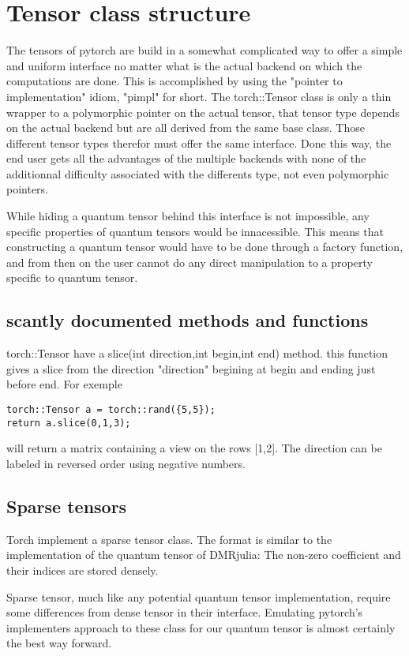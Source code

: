 \documentclass[15pt]{report}
\begin{document}
\section{Tensor class structure}

The tensors of pytorch are build in a somewhat complicated way to offer a simple and uniform interface no matter what is the actual backend on which the computations are done.
This is accomplished by using the "pointer to implementation" idiom, "pimpl" for short. The torch::Tensor class is only a thin wrapper to a polymorphic pointer on the actual tensor, that tensor type depends on the actual backend but are all derived from the same base class. Those different tensor types therefor must offer the same interface.
Done this way, the end user gets all the advantages of the multiple backends with none of the additionnal difficulty associated with the differents type, not even polymorphic pointers.

While hiding a quantum tensor behind this interface is not impossible, any specific properties of quantum tensors would be innacessible. This means that constructing a quantum tensor would have to be done through a factory function, and from then on the user cannot do any direct manipulation to a property specific to quantum tensor.

\subsection{scantly documented methods and functions}
torch::Tensor have a slice(int direction,int begin,int end) method. this function gives a slice from the direction "direction" begining at begin and ending just before end.
For exemple
\begin{verbatim}
torch::Tensor a = torch::rand({5,5});
return a.slice(0,1,3); 
\end{verbatim}
will return a matrix containing a view on the rows [1,2].
The direction can be labeled in reversed order using negative numbers.


\subsection{Sparse tensors}
Torch implement a sparse tensor class. The format is similar to the implementation of the quantum tensor of DMRjulia: The non-zero coefficient and their indices are stored densely.

Sparse tensor, much like any potential quantum tensor implementation, require some differences from dense tensor in their interface. Emulating pytorch's implementers approach to these class for our quantum tensor is almost certainly the best way forward.
\end{document}
